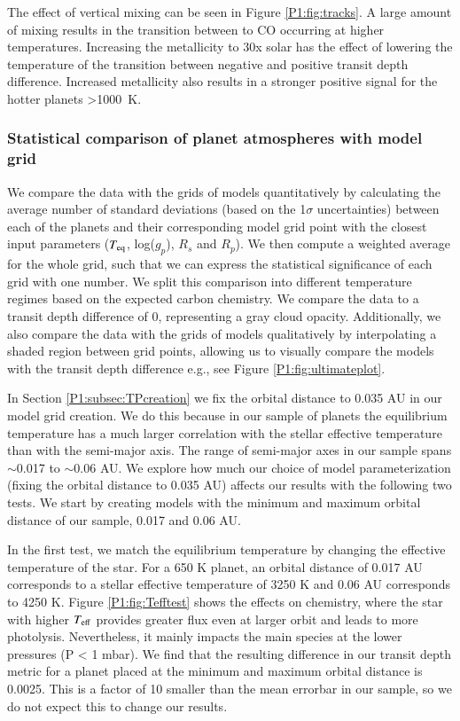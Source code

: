 The effect of vertical mixing can be seen in Figure \ref{P1:fig:tracks}. A large amount of mixing results in the transition between  to CO occurring at higher temperatures. Increasing the metallicity to 30x solar has the effect of lowering the temperature of the transition between negative and positive transit depth difference. Increased metallicity also results in a stronger positive signal for the hotter planets >1000~K.

\subsubsection{Statistical comparison of planet atmospheres with model grid}
\label{P1:sec:gridstats}

We compare the data with the grids of models quantitatively by calculating the average number of standard deviations (based on the 1$\sigma$ uncertainties) between each of the planets and their corresponding model grid point with the closest input parameters ($T_{\rm eq}$, log($g_p$), $R_s$ and $R_p$). We then compute a weighted average for the whole grid, such that we can express the statistical significance of each grid with one number. We split this comparison into different temperature regimes based on the expected carbon chemistry. We compare the data to a transit depth difference of 0, representing a gray cloud opacity. Additionally, we also compare the data with the grids of models qualitatively by interpolating a shaded region between grid points, allowing us to visually compare the models with the \spitzerIRAC transit depth difference e.g., see Figure \ref{P1:fig:ultimateplot}.

In Section \ref{P1:subsec:TPcreation} we fix the orbital distance to 0.035 AU in our model grid creation. We do this because in our sample of planets the equilibrium temperature has a much larger correlation with the stellar effective temperature than with the semi-major axis. The range of semi-major axes in our sample spans $\sim$0.017 to $\sim$0.06 AU. We explore how much our choice of model parameterization (fixing the orbital distance to 0.035 AU) affects our results with the following two tests. We start by creating models with the minimum and maximum orbital distance of our sample, 0.017 and 0.06 AU.

In the first test, we match the equilibrium temperature by changing the effective temperature of the star. For a 650 K planet, an orbital distance of 0.017 AU corresponds to a stellar effective temperature of 3250 K and 0.06 AU corresponds to 4250 K. Figure \ref{P1:fig:Tefftest} shows the effects on chemistry, where the star with higher $T_{\rm eff}$ provides greater flux even at larger orbit and leads to more photolysis. Nevertheless, it mainly impacts the main species at the lower pressures (P < 1 mbar). We find that the resulting difference in our transit depth metric for a planet placed at the minimum and maximum orbital distance is 0.0025. This is a factor of 10 smaller than the mean errorbar in our sample, so we do not expect this to change our results.

